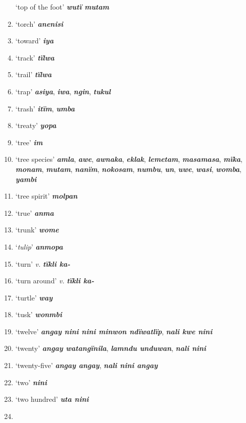 \begin{enumerate}[noitemsep, label={}, align=left, widest=190, labelsep=1ex,leftmargin=*,itemindent=-10pt]
‘top of the foot’ \textbf{\textit{wutï mutam}} \item
‘torch’ \textbf{\textit{anenisi}} \item
‘toward’ \textbf{\textit{iya}} \item
‘track’ \textbf{\textit{tïlwa}} \item
‘trail’ \textbf{\textit{tïlwa}} \item
‘trap’ \textbf{\textit{asiya}}, \textbf{\textit{iwa}}, \textbf{\textit{ngin}}, \textbf{\textit{tukul}} \item
‘trash’ \textbf{\textit{itïm}}, \textbf{\textit{umba}} \item
‘treaty’ \textbf{\textit{yopa}} \item
‘tree’ \textbf{\textit{im}} \item
‘tree species’ \textbf{\textit{amla}}, \textbf{\textit{awe}}, \textbf{\textit{awnaka}}, \textbf{\textit{eklak}}, \textbf{\textit{lemetam}}, \textbf{\textit{masamasa}}, \textbf{\textit{mïka}}, \linebreak \textbf{\textit{monam}}, \textbf{\textit{mutam}}, \textbf{\textit{nanïm}}, \textbf{\textit{nokosam}}, \textbf{\textit{numbu}}, \textbf{\textit{un}}, \textbf{\textit{uwe}}, \textbf{\textit{wasi}}, \textbf{\textit{womba}}, \textbf{\textit{yambi}} \item
‘tree spirit’ \textbf{\textit{molpan}} \item
‘true’ \textbf{\textit{anma}} \item
‘trunk’ \textbf{\textit{wome}} \item
‘\textit{tulip}’ \textbf{\textit{anmopa}} \item
‘turn’ \textit{v.} \textbf{\textit{tïkli ka-}} \item
‘turn around’ \textit{v.} \textbf{\textit{tïkli ka-}} \item
‘turtle’ \textbf{\textit{way}} \item
‘tusk’ \textbf{\textit{wonmbi}} \item
‘twelve’ \textbf{\textit{angay nini nini minwon ndïwatlïp}}, \textbf{\textit{nali kwe nini}} \item
‘twenty’ \textbf{\textit{angay watangïnila}}, \textbf{\textit{lamndu unduwan}}, \textbf{\textit{nali nini}} \item
‘twenty-five’ \textbf{\textit{angay angay}}, \textbf{\textit{nali nini angay}} \item
‘two’ \textbf{\textit{nini}} \item
\largerpage
‘two hundred’ \textbf{\textit{uta nini}}\\ \item


\end{enumerate}
